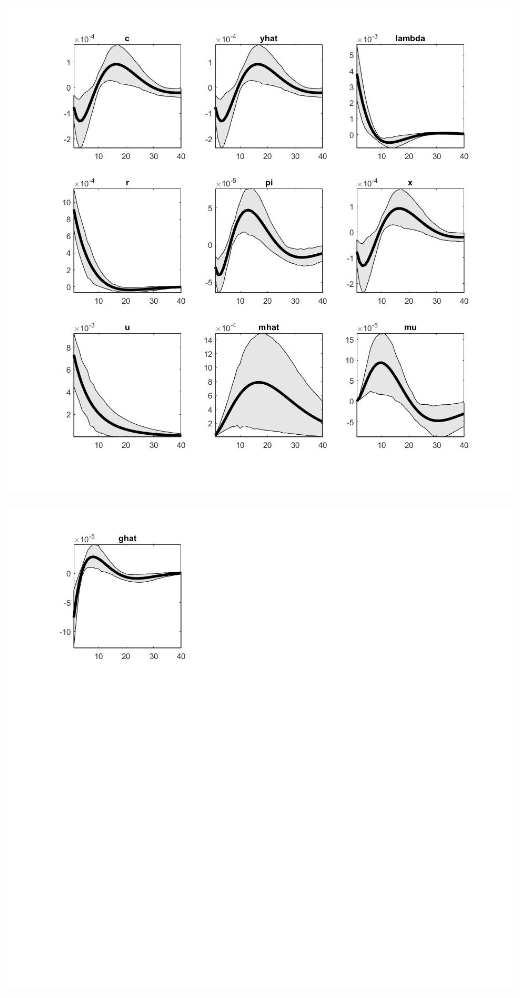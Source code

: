\documentclass[11pt,preprint, authoryear]{elsarticle}
\let\origfigure\figure
\let\endorigfigure\endfigure
\renewenvironment{figure}[1][2] {
    \expandafter\origfigure\expandafter[H]
} {
    \endorigfigure
}
\numberwithin{equation}{section}
\numberwithin{figure}{section}
\numberwithin{table}{section}
\begin{document}
\begin{figure}
    \centering 
    \begin{minipage}[t]{8.2cm} 
        \centering 
        \includegraphics[width=\linewidth]{flex_u1.jpg} 
    \end{minipage} 
    \hspace{0.1cm} 
    \begin{minipage}[t]{8.2cm} 
        \centering 
        \includegraphics[width=\linewidth]{flex_u2.jpg} 
    \end{minipage}
    \caption{Orthogonalized Shock to Money Demand Shock - Flexible Money Growth Rule}
    \label{flex_u}
\end{figure}
\end{document}
